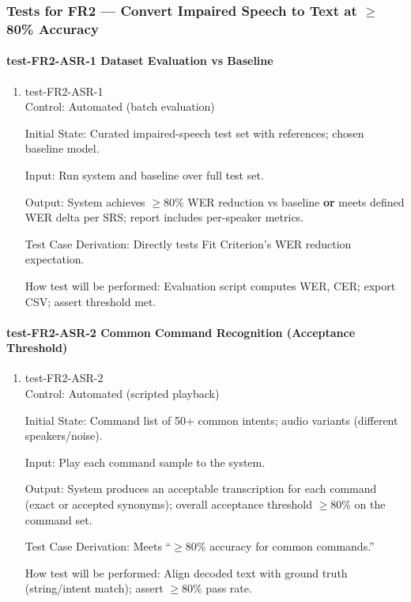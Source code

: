 \documentclass[12pt, titlepage]{article}
\begin{document}
\subsubsection{Tests for FR2 — Convert Impaired Speech to Text at $\geq$80\% Accuracy}

\paragraph{test-FR2-ASR-1 Dataset Evaluation vs Baseline}

\begin{enumerate}
\item{test-FR2-ASR-1\\}
Control: Automated (batch evaluation)

Initial State: Curated impaired-speech test set with references; chosen baseline model.

Input: Run system and baseline over full test set.

Output: System achieves $\geq$80\% WER reduction vs baseline \textbf{or} meets defined WER delta per SRS; report includes per-speaker metrics.

Test Case Derivation: Directly tests Fit Criterion’s WER reduction expectation.

How test will be performed: Evaluation script computes WER, CER; export CSV; assert threshold met.
\end{enumerate}

\paragraph{test-FR2-ASR-2 Common Command Recognition (Acceptance Threshold)}

\begin{enumerate}
\item{test-FR2-ASR-2\\}
Control: Automated (scripted playback)

Initial State: Command list of 50+ common intents; audio variants (different speakers/noise).

Input: Play each command sample to the system.

Output: System produces an acceptable transcription for each command (exact or accepted synonyms); overall acceptance threshold $\geq$80\% on the command set.

Test Case Derivation: Meets “$\geq$80\% accuracy for common commands.”

How test will be performed: Align decoded text with ground truth (string/intent match); assert $\geq$80\% pass rate.
\end{enumerate}
\end{document}
